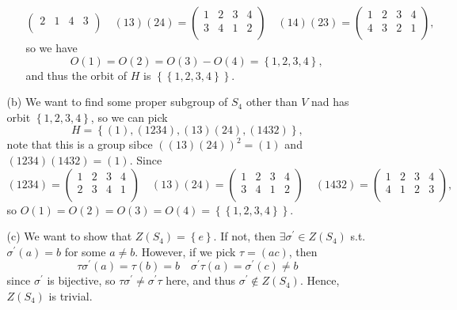 \documentclass[12pt]{article}
\begin{document}
\begin{enumerate}
\begin{itemize}
\begin{itemize}
\[\begin{pmatrix}
                    2 & 1 & 4 & 3  \\
                \end{pmatrix} \quad (13)(24) = \begin{pmatrix}
                    1 & 2 & 3 & 4  \\
                    3 & 4 & 1 & 2  \\
                \end{pmatrix} \quad (14)(23) = \begin{pmatrix}
                    1 & 2 & 3 & 4  \\
                    4 & 3 & 2 & 1  \\
                \end{pmatrix},
            \] so we have 
            \[
                O(1) = O(2) = O(3) - O(4) = \left\{ 1, 2, 3, 4 \right\}, 
            \] and thus the orbit of \(H\) is \(\left\{ \left\{ 1, 2, 3, 4 \right\}  \right\} \).  
        \end{itemize}
        \item [(b)] We want to find some proper subgroup of \(S_4\) other than \(V\) nad has orbit \(\left\{ 1, 2, 3, 4 \right\} \), so we can pick 
        \[
            H = \left\{ (1), (1234), (13)(24), (1432) \right\},
        \] note that this is a group sibce \(\left( (13)(24) \right)^2 = (1) \) and \((1234)(1432) = (1)\). Since 
        \[
            (1234) = \begin{pmatrix}
                    1 & 2 & 3 & 4  \\
                    2 & 3 & 4 & 1  \\
                \end{pmatrix} \quad (13)(24) = \begin{pmatrix}
                    1 & 2 & 3 & 4  \\
                    3 & 4 & 1 & 2  \\
                \end{pmatrix} \quad (1432) = \begin{pmatrix}
                    1 & 2 & 3 & 4  \\
                    4 & 1 & 2 & 3  \\
                \end{pmatrix},
        \]  so \(O(1) = O(2) = O(3) = O(4) = \left\{ \left\{ 1, 2, 3, 4 \right\}  \right\} \).  
        \item [(c)] We want to show that \(Z(S_4) = \left\{ e \right\} \). If not, then \(\exists \sigma ^{\prime} \in Z(S_4)\) s.t. \(\sigma ^{\prime} (a) = b\) for some \(a \neq b\). However, if we pick \(\tau = (ac)\), then 
        \[
            \tau \sigma ^{\prime} (a) = \tau (b) = b \quad \sigma ^{\prime} \tau (a) = \sigma ^{\prime} (c) \neq b
        \] since \(\sigma ^{\prime} \) is bijective, so \(\tau \sigma ^{\prime} \neq \sigma ^{\prime} \tau \) here, and thus \(\sigma^{\prime} \notin Z(S_4) \). Hence, \(Z(S_4)\) is trivial.      
    \end{itemize}
    \bigskip


\end{enumerate}
\end{document}

